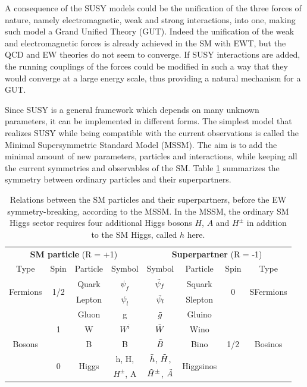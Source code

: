 A consequence of the SUSY models could be the unification of the three forces of nature, namely electromagnetic, weak and strong interactions, into one, making such model a Grand Unified Theory (GUT). Indeed the unification of the weak and electromagnetic forces is already achieved in the SM with EWT, but the QCD and EW theories do not seem to converge. If SUSY interactions are added, the running couplings of the forces could be modified in such a way that they would converge at a large energy scale, thus providing a natural mechanism for a GUT.\newline

Since SUSY is a general framework which depends on many unknown parameters, it can be implemented in different forms. The simplest model that realizes SUSY while being compatible with the current observations is called the Minimal Supersymmetric Standard Model (MSSM). The aim is to add the minimal amount of new parameters, particles and interactions, while keeping all the current symmetries and observables of the SM. Table \ref{tab:superpartners} summarizes the symmetry between ordinary particles and their superpartners.

\begin{table}[]
    \centering
    \begin{tabular}{c c c c | c c c c}
        \hline
         \multicolumn{4}{c}{\textbf{SM particle} (R = +1)} & \multicolumn{4}{c}{\textbf{Superpartner} (R = -1)} \\
        Type & Spin & Particle & Symbol & Symbol & Particle & Spin & Type \\
        \hline
        \multirow{2}{*}{Fermions} & \multirow{2}{*}{1/2} & Quark & $\psi_f$ & $\Tilde{\psi}_f$ & Squark & \multirow{2}{*}{0} & \multirow{2}{*}{SFermions} \\
         & & Lepton & $\psi_l$ & $\Tilde{\psi}_l$ & Slepton & & \\
         \hline
         \multirow{5}{*}{Bosons} & \multirow{3}{*}{1} & Gluon & g & $\Tilde{g}$
   & Gluino & \multirow{5}{*}{1/2} & \multirow{5}{*}{Bosinos} \\
          & & W & $W^i$ & $\Tilde{W}$ & Wino & & \\
          & & B & B & $\Tilde{B}$ & Bino & & \\
          & \multirow{2}{*}{0} & \multirow{2}{*}{Higgs} & h, H, & $\Tilde{h}$, $\Tilde{H}$, & \multirow{2}{*}{Higgsinos} & & \\
          & & & $H^{\pm}$, A & $\Tilde{H}^{\pm}$, $\Tilde{A}$ & & & \\ 
          \hline
    \end{tabular}
    \caption{Relations between the SM particles and their superpartners, before the EW symmetry-breaking, according to the MSSM. In the MSSM, the ordinary SM Higgs sector requires four additional Higgs bosons $H$, $A$ and $H^{\pm}$ in addition to the SM Higgs, called $h$ here.}
    \label{tab:superpartners}
\end{table}

